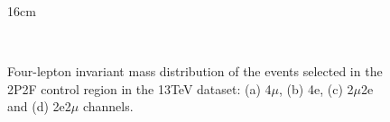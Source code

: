 \begin{figure}[htbp]{16cm}
	\caption{Four-lepton invariant mass distribution of the events selected in the 2P2F control region in the 13TeV dataset: (a) 4$\mu$, (b) 4e, (c) 2$\mu$2e and (d) 2e2$\mu$ channels.}
	\centering
	\\

\end{figure}
